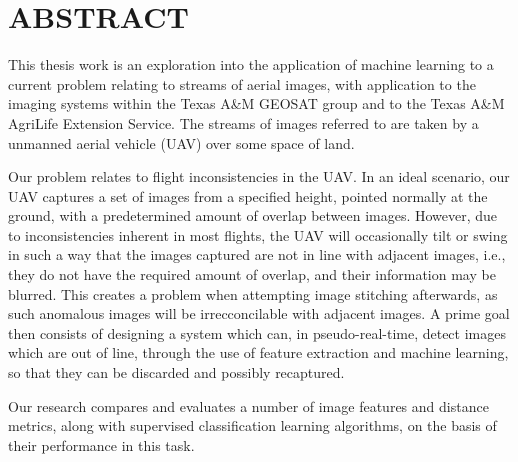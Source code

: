 
\chapter*{ABSTRACT}

\pagestyle{plain} %
\setcounter{page}{2}

\indent This thesis work is an exploration into the application of machine learning to a current problem relating to streams of aerial images, with application to the imaging systems within the Texas A\&M GEOSAT group and to the Texas A\&M AgriLife Extension Service.
The streams of images referred to are taken by a unmanned aerial vehicle (UAV) over some space of land.

Our problem relates to flight inconsistencies in the UAV.
In an ideal scenario, our UAV captures a set of images from a specified height, pointed normally at the ground, with a predetermined amount of overlap between images.
However, due to inconsistencies inherent in most flights, the UAV will occasionally tilt or swing in such a way that the images captured are not in line with adjacent images, i.e., they do not have the required amount of overlap, and their information may be blurred.
This creates a problem when attempting image stitching afterwards, as such anomalous images will be irrecconcilable with adjacent images.
A prime goal then consists of designing a system which can, in pseudo-real-time, detect images which are out of line, through the use of feature extraction and machine learning, so that they can be discarded and possibly recaptured.

Our research compares and evaluates a number of image features and distance metrics, along with supervised classification learning algorithms, on the basis of their performance in this task.


\pagebreak{}

